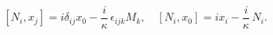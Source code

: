 \begin{equation}\label{30}
[N_i, x_j] = i \delta_{ij} x_0 - \frac{i}\kappa\, \epsilon_{ijk} M_k, \quad
[N_i, x_0] = i x_{i} - \frac{i}\kappa\, N_i.
\end{equation}

